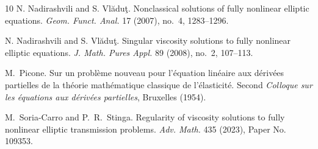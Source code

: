 \documentclass[letter,11pt]{amsart}
\theoremstyle{definition}
\numberwithin{equation}{section}
\begin{document}
\begin{thebibliography}{10}
N. Nadirashvili and S. Vl\u adu\c t.
Nonclassical solutions of fully nonlinear elliptic equations.
\textit{Geom. Funct. Anal.} 17 (2007), no.~4, 1283--1296.

N. Nadirashvili and S. Vl\u adu\c t.
Singular viscosity solutions to fully nonlinear elliptic equations.
\textit{J. Math. Pures Appl.} 89 (2008), no.~2, 107--113.

M.~Picone.
Sur un probl\`{e}me nouveau pour l'\'{e}quation lin\'{e}aire aux d\'{e}riv\'{e}es partielles de la th\'{e}orie math\'{e}matique classique de l'\'{e}lasticit\'{e}.
Second \textit{Colloque sur les \'{e}quations aux d\'{e}riv\'{e}es partielles}, Bruxelles (1954).

M.~Soria-Carro and P.~R.~Stinga.
Regularity of viscosity solutions to fully nonlinear elliptic transmission problems.
\textit{Adv. Math.} 435 (2023), Paper No. 109353.

\end{thebibliography}
\end{document}
